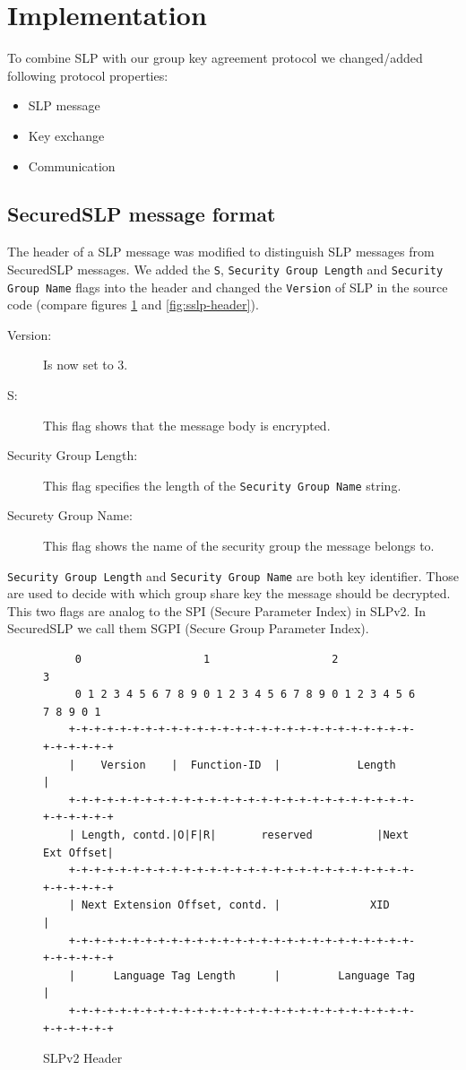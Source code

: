 \section{Implementation}
To combine SLP with our group key agreement protocol we changed/added following protocol properties:
\begin{itemize}
  \item SLP message
  \item Key exchange
  \item Communication
\end{itemize}

\subsection{SecuredSLP message format}
The header of a SLP message was modified to distinguish SLP messages from SecuredSLP messages. We added the \texttt{S}, \texttt{Security Group Length} and \texttt{Security Group Name} flags into the header and changed the \texttt{Version} of SLP in the source code (compare figures \ref{fig:slp-header} and \ref{fig:sslp-header}).
\begin{description}
\item[Version:] Is now set to 3.
\item[S:] This flag shows that the message body is encrypted.
\item[Security Group Length:] This flag specifies the length of the \texttt{Security Group Name} string.  
\item[Securety Group Name:] This flag shows the name of the security group the message belongs to.
\end{description}
\texttt{Security Group Length} and \texttt{Security Group Name} are both key identifier. Those are used to decide with which group share key the message should be decrypted. This two flags are analog to the SPI (Secure Parameter Index) in SLPv2. In SecuredSLP we call them SGPI (Secure Group Parameter Index).
\begin{figure}[!h]
\begin{lstlisting}
	 0                   1                   2                   3
	 0 1 2 3 4 5 6 7 8 9 0 1 2 3 4 5 6 7 8 9 0 1 2 3 4 5 6 7 8 9 0 1
	+-+-+-+-+-+-+-+-+-+-+-+-+-+-+-+-+-+-+-+-+-+-+-+-+-+-+-+-+-+-+-+-+
	|    Version    |  Function-ID  |            Length             |
	+-+-+-+-+-+-+-+-+-+-+-+-+-+-+-+-+-+-+-+-+-+-+-+-+-+-+-+-+-+-+-+-+
	| Length, contd.|O|F|R|       reserved          |Next Ext Offset|
	+-+-+-+-+-+-+-+-+-+-+-+-+-+-+-+-+-+-+-+-+-+-+-+-+-+-+-+-+-+-+-+-+
	| Next Extension Offset, contd. |              XID              |
	+-+-+-+-+-+-+-+-+-+-+-+-+-+-+-+-+-+-+-+-+-+-+-+-+-+-+-+-+-+-+-+-+
	|      Language Tag Length      |         Language Tag          |
	+-+-+-+-+-+-+-+-+-+-+-+-+-+-+-+-+-+-+-+-+-+-+-+-+-+-+-+-+-+-+-+-+
\end{lstlisting}
\label{fig:slp-header}
\caption{SLPv2 Header}
\end{figure}

